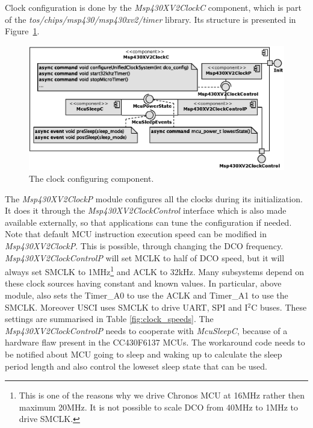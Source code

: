 Clock configuration is done by the \emph{Msp430XV2ClockC} component, which is part of the \emph{tos/chips/msp430/msp430xv2/timer} library. Its structure is presented in Figure~\ref{fig:Msp430XV2ClockC}.
\begin{figure}[h]
  \centering
  \includegraphics[width=1.05\textwidth]{diagrams/Msp430XV2ClockC.eps}
  \caption{The clock configuring component.}
  \label{fig:Msp430XV2ClockC}
\end{figure}
The \emph{Msp430XV2ClockP} module configures all the clocks during its initialization. It does it through the \emph{Msp430XV2ClockControl} interface which is also made available externally, so that applications can tune the configuration if needed. Note that default MCU instruction execution speed can be modified in \emph{Msp430XV2ClockP}. This is possible, through changing the DCO frequency. \emph{Msp430XV2ClockControlP} will set MCLK to half of DCO speed, but it will always set SMCLK to 1MHz\footnote{This is one of the reasons why we drive Chronos MCU at 16MHz rather then maximum 20MHz. It is not possible to scale DCO from 40MHz to 1MHz to drive SMCLK.} and ACLK to 32kHz. Many subsystems depend on these clock sources having constant and known values. In particular, above module, also sets the Timer\_A0 to use the ACLK and Timer\_A1 to use the SMCLK. Moreover USCI uses SMCLK to drive UART, SPI and I$^2$C buses. These settings are summarised in Table \ref{fig:clock_speeds}.
The \emph{Msp430XV2ClockControlP} needs to cooperate with \emph{McuSleepC}, because of a hardware flaw present in the CC430F6137 MCUs. The workaround code needs to be notified about MCU going to sleep and waking up to calculate the sleep period length and also control the loweset sleep state that can be used.
